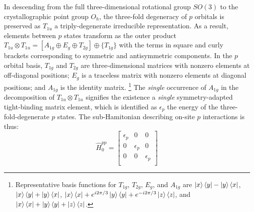 \documentclass[twocolumn,showpacs,preprintnumbers,superscriptaddress,prb,floatfix,aps,10pt]{revtex4-1}
\newcommand*{\ham}{\hat{H}}
\begin{document}
In descending from the full three-dimensional rotational group $SO(3)$ to the crystallographic point group $O_h$, the three-fold degeneracy of $p$ orbitals is preserved as $T_{1u}$ a triply-degenerate irreducible representation. As a result, elements between $p$ states transform as the outer product $T_{1u} \otimes T_{1u} = [A_{1g} \oplus E_g \oplus T_{2g}] \oplus \{T_{1g}\}$ with the terms in square and curly brackets corresponding to symmetric and antisymmetric components. In the $p$ orbital basis, $T_{1g}$ and $T_{2g}$ are three-dimensional matrices with nonzero elements at off-diagonal positions; $E_g$ is a traceless matrix with nonzero elements at diagonal positions; and $A_{1g}$ is the identity matrix. \footnote{Representative basis functions for $T_{1g}$, $T_{2g}$, $E_g$, and $A_{1g}$ are $\ket{x}\bra{y} - \ket{y}\bra{x}$, $\ket{x}\bra{y} + \ket{y}\bra{x}$, $\ket{x}\bra{x} + e^{i2\pi/3}\ket{y}\bra{y} + e^{-i2\pi/3}\ket{z}\bra{z}$, and $\ket{x}\bra{x} + \ket{y}\bra{y} + \ket{z}\bra{z}$.} The \emph{single} occurrence of $A_{1g}$ in the decomposition of $T_{1u} \otimes T_{1u}$ signifies the existence a \emph{single} symmetry-adapted tight-binding matrix element, which is identified as $\epsilon_p$ the energy of the three-fold-degenerate $p$ states. The sub-Hamitonian describing on-site $p$ interactions is thus:
%
\begin{equation}
\label{eq:0pp}
\ham_0^{pp} =
\begin{bmatrix}
\epsilon_{p} & 0 & 0 \\
0 & \epsilon_{p} & 0 \\
0 & 0 & \epsilon_{p} \\
\end{bmatrix}
\end{equation}
%
\end{document}
